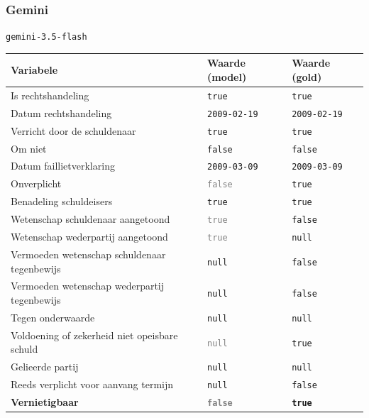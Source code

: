 \documentclass[
  dutch,
  a4paper,
]{article}
\begin{document}
\newpage


\subsubsection{Gemini}\label{gemini-28}

\texttt{gemini-3.5-flash}

\begin{center}
\small
\begin{tabular}{@{}p{7.4cm}p{2.6cm}p{2.6cm}@{}}
\toprule
Variabele & Waarde (model) & Waarde (gold) \\
\midrule
Is rechtshandeling & \texttt{true} & \texttt{true} \\
Datum rechtshandeling & \texttt{2009-02-19} & \texttt{2009-02-19} \\
Verricht door de schuldenaar & \texttt{true} & \texttt{true} \\
Om niet & \texttt{false} & \texttt{false} \\
Datum faillietverklaring & \texttt{2009-03-09} & \texttt{2009-03-09} \\
Onverplicht & \textcolor{gray}{\texttt{false}} & \texttt{true} \\
Benadeling schuldeisers & \texttt{true} & \texttt{true} \\
Wetenschap schuldenaar aangetoond & \textcolor{gray}{\texttt{true}} & \texttt{false} \\
Wetenschap wederpartij aangetoond & \textcolor{gray}{\texttt{true}} & \texttt{null} \\
Vermoeden wetenschap schuldenaar tegenbewijs & \texttt{null} & \texttt{false} \\
Vermoeden wetenschap wederpartij tegenbewijs & \texttt{null} & \texttt{false} \\
Tegen onderwaarde & \texttt{null} & \texttt{null} \\
Voldoening of zekerheid niet opeisbare schuld & \textcolor{gray}{\texttt{null}} & \texttt{true} \\
Gelieerde partij & \texttt{null} & \texttt{null} \\
Reeds verplicht voor aanvang termijn & \texttt{null} & \texttt{false} \\
\textbf{Vernietigbaar} & \textbf{\textcolor{gray}{\texttt{false}}} & \textbf{\texttt{true}} \\
\bottomrule
\end{tabular}
\end{center}
\end{document}
